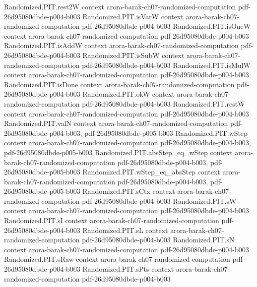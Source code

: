 \begin{theorem}
\proofstep
  {Randomized.PIT.rest2W}
  {context}
  {arora-barak-ch07-randomized-computation}
  {pdf-26d95080dbde-p004-b003}
\proofstep
  {Randomized.PIT.isVarW}
  {context}
  {arora-barak-ch07-randomized-computation}
  {pdf-26d95080dbde-p004-b003}
\proofstep
  {Randomized.PIT.isOneW}
  {context}
  {arora-barak-ch07-randomized-computation}
  {pdf-26d95080dbde-p004-b003}
\proofstep
  {Randomized.PIT.isAddW}
  {context}
  {arora-barak-ch07-randomized-computation}
  {pdf-26d95080dbde-p004-b003}
\proofstep
  {Randomized.PIT.isSubW}
  {context}
  {arora-barak-ch07-randomized-computation}
  {pdf-26d95080dbde-p004-b003}
\proofstep
  {Randomized.PIT.isMulW}
  {context}
  {arora-barak-ch07-randomized-computation}
  {pdf-26d95080dbde-p004-b003}
\proofstep
  {Randomized.PIT.isDone}
  {context}
  {arora-barak-ch07-randomized-computation}
  {pdf-26d95080dbde-p004-b003}
\proofstep
  {Randomized.PIT.okW}
  {context}
  {arora-barak-ch07-randomized-computation}
  {pdf-26d95080dbde-p004-b003}
\proofstep
  {Randomized.PIT.restW}
  {context}
  {arora-barak-ch07-randomized-computation}
  {pdf-26d95080dbde-p004-b003}
\proofstep
  {Randomized.PIT.valN}
  {context}
  {arora-barak-ch07-randomized-computation}
  {pdf-26d95080dbde-p004-b003,
    pdf-26d95080dbde-p005-b003}
\proofstep
  {Randomized.PIT.wStep}
  {context}
  {arora-barak-ch07-randomized-computation}
  {pdf-26d95080dbde-p004-b003,
    pdf-26d95080dbde-p005-b003}
\proofstep
  {Randomized.PIT.absStep_eq_wStep}
  {context}
  {arora-barak-ch07-randomized-computation}
  {pdf-26d95080dbde-p004-b003,
    pdf-26d95080dbde-p005-b003}
\proofstep
  {Randomized.PIT.wStep_eq_absStep}
  {context}
  {arora-barak-ch07-randomized-computation}
  {pdf-26d95080dbde-p004-b003,
    pdf-26d95080dbde-p005-b003}
\proofstep
  {Randomized.PIT.sCtx}
  {context}
  {arora-barak-ch07-randomized-computation}
  {pdf-26d95080dbde-p004-b003}
\proofstep
  {Randomized.PIT.sW}
  {context}
  {arora-barak-ch07-randomized-computation}
  {pdf-26d95080dbde-p004-b003}
\proofstep
  {Randomized.PIT.sI}
  {context}
  {arora-barak-ch07-randomized-computation}
  {pdf-26d95080dbde-p004-b003}
\proofstep
  {Randomized.PIT.sL}
  {context}
  {arora-barak-ch07-randomized-computation}
  {pdf-26d95080dbde-p004-b003}
\proofstep
  {Randomized.PIT.sN}
  {context}
  {arora-barak-ch07-randomized-computation}
  {pdf-26d95080dbde-p004-b003}
\proofstep
  {Randomized.PIT.sRaw}
  {context}
  {arora-barak-ch07-randomized-computation}
  {pdf-26d95080dbde-p004-b003}
\proofstep
  {Randomized.PIT.sPts}
  {context}
  {arora-barak-ch07-randomized-computation}
  {pdf-26d95080dbde-p004-b003}
\proofstep

\end{theorem}

